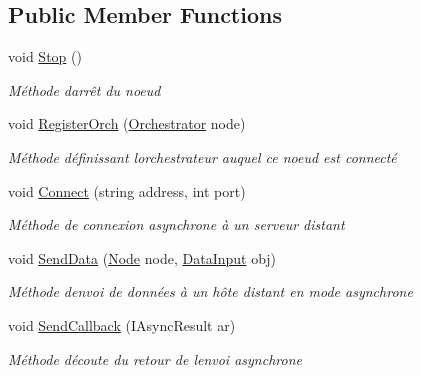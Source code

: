 \subsection*{Public Member Functions}
\begin{DoxyCompactItemize}
\item 
void \hyperlink{class_node_net_1_1_network_1_1_nodes_1_1_node_a7238e906549594e340d72f99e4575660}{Stop} ()
\begin{DoxyCompactList}\small\item\em Méthode d\textquotesingle{}arrêt du noeud \end{DoxyCompactList}\item 
void \hyperlink{class_node_net_1_1_network_1_1_nodes_1_1_node_a38ab7f4f4f8e67f4319f87d4fe51e2f7}{Register\+Orch} (\hyperlink{class_node_net_1_1_network_1_1_orch_1_1_orchestrator}{Orchestrator} node)
\begin{DoxyCompactList}\small\item\em Méthode définissant l\textquotesingle{}orchestrateur auquel ce noeud est connecté \end{DoxyCompactList}\item 
void \hyperlink{class_node_net_1_1_network_1_1_nodes_1_1_node_a649afad8e215121029809cc46c31e258}{Connect} (string address, int port)
\begin{DoxyCompactList}\small\item\em Méthode de connexion asynchrone à un serveur distant \end{DoxyCompactList}\item 
void \hyperlink{class_node_net_1_1_network_1_1_nodes_1_1_node_a208a1c10ae68109762205f3cbcb9665a}{Send\+Data} (\hyperlink{class_node_net_1_1_network_1_1_nodes_1_1_node}{Node} node, \hyperlink{class_node_net_1_1_data_1_1_data_input}{Data\+Input} obj)
\begin{DoxyCompactList}\small\item\em Méthode d\textquotesingle{}envoi de données à un hôte distant en mode asynchrone \end{DoxyCompactList}\item 
void \hyperlink{class_node_net_1_1_network_1_1_nodes_1_1_node_ab9094f08013b985dc96b429007b32333}{Send\+Callback} (I\+Async\+Result ar)
\begin{DoxyCompactList}\small\item\em Méthode d\textquotesingle{}écoute du retour de l\textquotesingle{}envoi asynchrone \end{DoxyCompactList}\item 

\end{DoxyCompactItemize}
